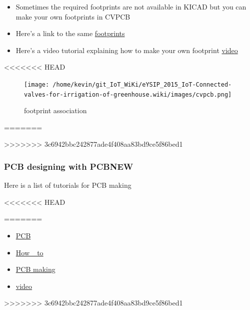 \documentclass[16pt]{article}
\begin{document}
\begin{itemize}

\item
  Sometimes the required footprints are not available in KICAD but you
  can make your own footprints in CVPCB
\item
 Here's a link to the same
\href{http://kicadhowto.wikidot.com/mcf1foot1}{footprints}
\item
Here's a video tutorial explaining how to make your own footprint
\href{https://www.youtube.com/watch?v=aVNMJVaRf6M}{video}
\end{itemize}

<<<<<<< HEAD
\begin{figure}

\texttt{[image: /home/kevin/git\_IoT\_WiKi/eYSIP\_2015\_IoT-Connected-valves-for-irrigation-of-greenhouse.wiki/images/cvpcb.png]}
\caption{footprint association}
\end{figure}
\vspace{0.4cm}
=======

>>>>>>> 3c6942bbc242877ade4f408aa83bd9ce5f86bed1

\subsubsection{PCB designing with
PCBNEW}
Here is a list of tutorials for PCB making

<<<<<<< HEAD
\vspace{25cm}

=======

\begin{itemize}

\item
\href{http://store.curiousinventor.com/guides/kicad/pcb_layout/change_part/}{PCB}
\item
\href{http://kicadhowto.wikidot.com/}{How \_to}
\item
\href{http://store.curiousinventor.com/guides/kicad/pcb_layout/}{PCB
 making}
\item
\href{https://www.youtube.com/watch?v=TYqmmj6SO-k}{video}
\end{itemize}
>>>>>>> 3c6942bbc242877ade4f408aa83bd9ce5f86bed1
\end{document}
